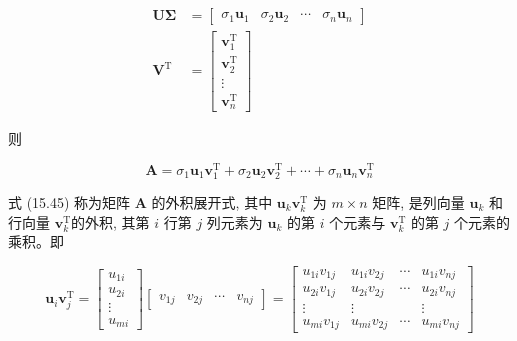 \documentclass[10pt]{article}
\begin{document}
$$
\begin{aligned}
\boldsymbol{U} \boldsymbol{\Sigma} & =\left[\begin{array}{cccc}
\sigma_{1} \boldsymbol{u}_{1} & \sigma_{2} \boldsymbol{u}_{2} & \cdots & \sigma_{n} \boldsymbol{u}_{n}
\end{array}\right] \\
\boldsymbol{V}^{\mathrm{T}} & =\left[\begin{array}{c}
\boldsymbol{v}_{1}^{\mathrm{T}} \\
\boldsymbol{v}_{2}^{\mathrm{T}} \\
\vdots \\
\boldsymbol{v}_{n}^{\mathrm{T}}
\end{array}\right]
\end{aligned}
$$

则


\begin{equation*}
\boldsymbol{A}=\sigma_{1} \boldsymbol{u}_{1} \boldsymbol{v}_{1}^{\mathrm{T}}+\sigma_{2} \boldsymbol{u}_{2} \boldsymbol{v}_{2}^{\mathrm{T}}+\cdots+\sigma_{n} \boldsymbol{u}_{n} \boldsymbol{v}_{n}^{\mathrm{T}} \tag{15.45}
\end{equation*}


式 (15.45) 称为矩阵 $\boldsymbol{A}$ 的外积展开式, 其中 $\boldsymbol{u}_{k} \boldsymbol{v}_{k}^{\mathrm{T}}$ 为 $m \times n$ 矩阵, 是列向量 $\boldsymbol{u}_{k}$ 和行向量 $\boldsymbol{v}_{k}^{\mathrm{T}}$的外积, 其第 $i$ 行第 $j$ 列元素为 $\boldsymbol{u}_{k}$ 的第 $i$ 个元素与 $\boldsymbol{v}_{k}^{\mathrm{T}}$ 的第 $j$ 个元素的乘积。即

$$
\boldsymbol{u}_{i} \boldsymbol{v}_{j}^{\mathrm{T}}=\left[\begin{array}{c}
u_{1 i} \\
u_{2 i} \\
\vdots \\
u_{m i}
\end{array}\right]\left[\begin{array}{llll}
v_{1 j} & v_{2 j} & \cdots & v_{n j}
\end{array}\right]=\left[\begin{array}{cccc}
u_{1 i} v_{1 j} & u_{1 i} v_{2 j} & \cdots & u_{1 i} v_{n j} \\
u_{2 i} v_{1 j} & u_{2 i} v_{2 j} & \cdots & u_{2 i} v_{n j} \\
\vdots & \vdots & & \vdots \\
u_{m i} v_{1 j} & u_{m i} v_{2 j} & \cdots & u_{m i} v_{n j}
\end{array}\right]
$$
\end{document}
